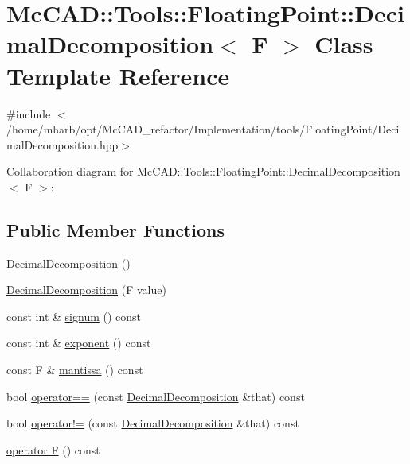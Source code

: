 \hypertarget{classMcCAD_1_1Tools_1_1FloatingPoint_1_1DecimalDecomposition}{}\section{Mc\+C\+AD\+:\+:Tools\+:\+:Floating\+Point\+:\+:Decimal\+Decomposition$<$ F $>$ Class Template Reference}
\label{classMcCAD_1_1Tools_1_1FloatingPoint_1_1DecimalDecomposition}


{\ttfamily \#include $<$/home/mharb/opt/\+Mc\+C\+A\+D\+\_\+refactor/\+Implementation/tools/\+Floating\+Point/\+Decimal\+Decomposition.\+hpp$>$}



Collaboration diagram for Mc\+C\+AD\+:\+:Tools\+:\+:Floating\+Point\+:\+:Decimal\+Decomposition$<$ F $>$\+:
\subsection*{Public Member Functions}
\begin{DoxyCompactItemize}
\item 
\hyperlink{classMcCAD_1_1Tools_1_1FloatingPoint_1_1DecimalDecomposition_a2f5c3902e65d030ea53f0cb7feb8e5f4}{Decimal\+Decomposition} ()
\item 
\hyperlink{classMcCAD_1_1Tools_1_1FloatingPoint_1_1DecimalDecomposition_a9dc57d79a1479fe9604a56672403acb3}{Decimal\+Decomposition} (F value)
\item 
const int \& \hyperlink{classMcCAD_1_1Tools_1_1FloatingPoint_1_1DecimalDecomposition_afb97c43fc8512ba3fbf24fde56966e88}{signum} () const
\item 
const int \& \hyperlink{classMcCAD_1_1Tools_1_1FloatingPoint_1_1DecimalDecomposition_a2398726a68527f9ccea4e5a1f3c41c3a}{exponent} () const
\item 
const F \& \hyperlink{classMcCAD_1_1Tools_1_1FloatingPoint_1_1DecimalDecomposition_a3bf69b278ef0747d8394a516d251957a}{mantissa} () const
\item 
bool \hyperlink{classMcCAD_1_1Tools_1_1FloatingPoint_1_1DecimalDecomposition_aede42da95040d0b77404ed5ecc8dd65e}{operator==} (const \hyperlink{classMcCAD_1_1Tools_1_1FloatingPoint_1_1DecimalDecomposition}{Decimal\+Decomposition} \&that) const
\item 
bool \hyperlink{classMcCAD_1_1Tools_1_1FloatingPoint_1_1DecimalDecomposition_a22a5cb9c6355bd7022d888eb32ef6737}{operator!=} (const \hyperlink{classMcCAD_1_1Tools_1_1FloatingPoint_1_1DecimalDecomposition}{Decimal\+Decomposition} \&that) const
\item 
\hyperlink{classMcCAD_1_1Tools_1_1FloatingPoint_1_1DecimalDecomposition_a8e530041f7f7ada9ad3a2bae87a2d0f3}{operator F} () const
\end{DoxyCompactItemize}

